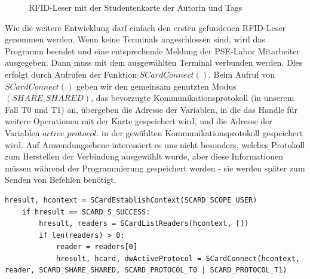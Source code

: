 \begin{figure}
	\caption{RFID-Leser mit der Studentenkarte der Autorin und Tags}
	\label{fig:baga_stud}
\end{figure} 
Wie die weitere Entwicklung darf einfach den ersten gefundenen RFID-Leser genommen werden. Wenn keine Terminals angeschlossen sind, wird das Programm beendet und eine entsprechende Meldung der PSE-Labor Mitarbeiter ausgegeben. Dann muss mit dem ausgewählten Terminal verbunden werden. Dies erfolgt durch Aufrufen der Funktion $SCardConnect()$. Beim Aufruf von $SCardConnect()$ geben wir den gemeinsam genutzten Modus $(SHARE\_SHARED)$, das bevorzugte Kommunikationsprotokoll (in unserem Fall T0 und T1) an, übergeben die Adresse der Variablen, in die das Handle für weitere Operationen mit der Karte gespeichert wird, und die Adresse der Variablen $active\_protocol$. in der gewählten Kommunikationsprotokoll gespeichert wird. Auf Anwendungsebene interessiert es uns nicht besonders, welches Protokoll zum Herstellen der Verbindung ausgewählt wurde, aber diese Informationen müssen während der Programmierung gespeichert werden - sie werden später zum Senden von Befehlen benötigt\cite[p. 104]{chirico:smart_card}.
\begin{lstlisting}[caption={Funktion SCardEstablishContext},captionpos=b]
hresult, hcontext = SCardEstablishContext(SCARD_SCOPE_USER)
	if hresult == SCARD_S_SUCCESS:
		hresult, readers = SCardListReaders(hcontext, [])
		if len(readers) > 0:
			reader = readers[0]
			hresult, hcard, dwActiveProtocol = SCardConnect(hcontext, reader, SCARD_SHARE_SHARED, SCARD_PROTOCOL_T0 | SCARD_PROTOCOL_T1)
\end{lstlisting}

